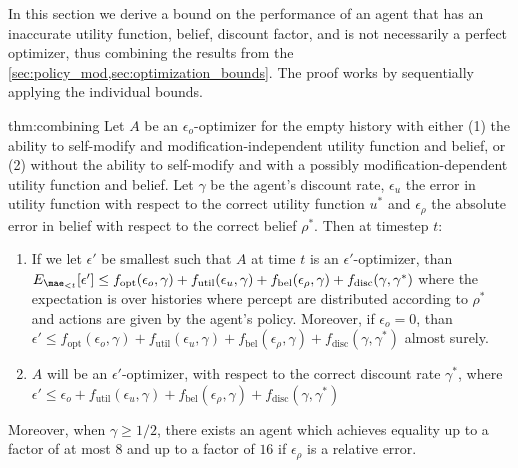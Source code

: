 In this section we derive a bound on the performance of an agent that has an inaccurate utility function, belief, discount factor, and is not necessarily a perfect optimizer, thus combining the results from the \cref{sec:policy_mod,sec:optimization_bounds}. The proof works by sequentially applying the individual bounds.

\begin{repeatthm}{thm:combining}
Let $A$ be an $\epsilon_o$-optimizer for the empty history with either (1) the ability to self-modify and modification-independent utility function and belief, or (2) without the ability to self-modify and with a possibly modification-dependent utility function and belief. Let $\gamma$ be the agent's discount rate, $\epsilon_u$ the error in utility function with respect to the correct utility function $u^*$ and $\epsilon_\rho$ the absolute error in belief with respect to the correct belief $\rho^*$. Then at timestep $t$:
\begin{enumerate}[(1)]
\item If we let $\epsilon'$ be smallest such that $A$ at time $t$ is an $\epsilon'$-optimizer, than $E_{\mae_{<t}}[\epsilon'] \leq f_\text{opt}(\epsilon_o, \gamma) + f_\text{util}(\epsilon_u, \gamma) + f_\text{bel}(\epsilon_\rho, \gamma) + f_\text{disc}(\gamma, \gamma^*)$ where the expectation is over histories where percept are distributed according to $\rho^*$ and actions are given by the agent's policy. Moreover, if $\epsilon_o = 0$, than $\epsilon' \leq f_\text{opt}(\epsilon_o, \gamma) + f_\text{util}(\epsilon_u, \gamma) + f_\text{bel}(\epsilon_\rho, \gamma) + f_\text{disc}(\gamma, \gamma^*)$ almost surely.
\item $A$ will be an $\epsilon'$-optimizer, with respect to the correct discount rate $\gamma^*$, where $\epsilon' \leq \epsilon_o + f_\text{util}(\epsilon_u, \gamma) + f_\text{bel}(\epsilon_\rho, \gamma) + f_\text{disc}(\gamma, \gamma^*)$ 
\end{enumerate}

Moreover, when $\gamma \geq 1/2$, there exists an agent which achieves equality up to a factor of at most $8$ and up to a factor of $16$ if $\epsilon_\rho$ is a relative error.
\end{repeatthm}
